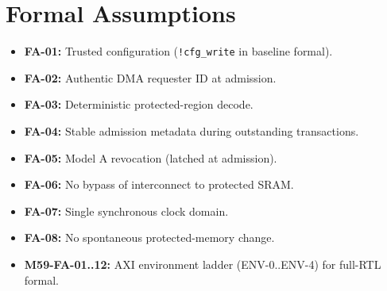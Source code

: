 \section{Formal Assumptions}
\label{app:assumptions}

\begin{itemize}
  \item \textbf{FA-01:} Trusted configuration (\texttt{!cfg\_write} in baseline formal).
  \item \textbf{FA-02:} Authentic DMA requester ID at admission.
  \item \textbf{FA-03:} Deterministic protected-region decode.
  \item \textbf{FA-04:} Stable admission metadata during outstanding transactions.
  \item \textbf{FA-05:} Model A revocation (latched at admission).
  \item \textbf{FA-06:} No bypass of interconnect to protected SRAM.
  \item \textbf{FA-07:} Single synchronous clock domain.
  \item \textbf{FA-08:} No spontaneous protected-memory change.
  \item \textbf{M59-FA-01..12:} AXI environment ladder (ENV-0..ENV-4) for full-RTL formal.
\end{itemize}
